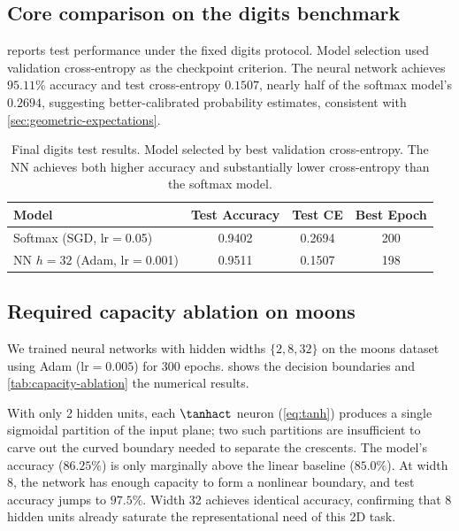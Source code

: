 \documentclass[sigconf,screen,nonacm]{acmart}
\begin{document}
\subsection{Core comparison on the digits benchmark}
\label{sec:exp-digits}

 reports test performance under the fixed digits protocol. Model selection used validation cross-entropy as the checkpoint criterion. The neural network achieves $95.11\%$ accuracy and test cross-entropy $0.1507$, nearly half of the softmax model's $0.2694$, suggesting better-calibrated probability estimates, consistent with \cref{sec:geometric-expectations}.

\begin{table}[H]
    \centering
    \caption{Final digits test results. Model selected by best validation cross-entropy. The NN achieves both higher accuracy and substantially lower cross-entropy than the softmax model.}
    \label{tab:digits-results}
    \begin{tabular}{lccc}
        \toprule
        Model & Test Accuracy & Test CE & Best Epoch \\
        \midrule
        Softmax (SGD, lr$=$0.05) & 0.9402 & 0.2694 & 200 \\
        NN $h{=}32$ (Adam, lr$=$0.001) & 0.9511 & 0.1507 & 198 \\
        \bottomrule
    \end{tabular}
\end{table}

\subsection{Required capacity ablation on moons}
\label{sec:exp-capacity}

We trained neural networks with hidden widths $\{2, 8, 32\}$ on the moons dataset using Adam ($\text{lr}=0.005$) for 300 epochs.  shows the decision boundaries and \cref{tab:capacity-ablation} the numerical results.

With only 2 hidden units, each $\tanhact$ neuron (\cref{eq:tanh}) produces a single sigmoidal partition of the input plane; two such partitions are insufficient to carve out the curved boundary needed to separate the crescents. The model's accuracy ($86.25\%$) is only marginally above the linear baseline ($85.0\%$). At width 8, the network has enough capacity to form a nonlinear boundary, and test accuracy jumps to $97.5\%$. Width 32 achieves identical accuracy, confirming that 8 hidden units already saturate the representational need of this 2D task.
\end{document}
